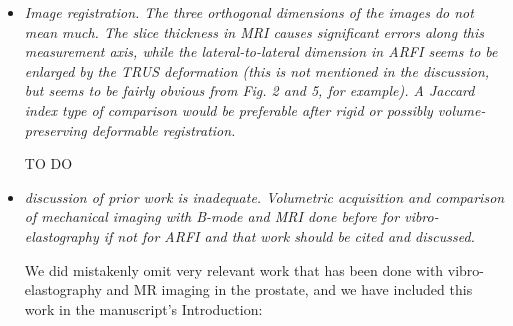 \documentclass[10pt]{article}
\begin{document}
\begin{itemize}
    \item \textit{Image registration. The three orthogonal dimensions of the
            images do not mean much. The slice thickness in MRI causes
            significant errors along this measurement axis, while the
            lateral-to-lateral dimension in ARFI seems to be enlarged by the
            TRUS deformation (this is not mentioned in the discussion, but
            seems to be fairly obvious from Fig. 2 and 5, for example). A
            Jaccard index type of comparison would be preferable after rigid or
            possibly volume-preserving deformable registration.}

    TO DO

    \item \textit{discussion of prior work is inadequate. Volumetric
            acquisition and comparison of mechanical imaging with B-mode and
            MRI done before for vibro-elastography if not for ARFI and that
            work should be cited and discussed.}

    We did mistakenly omit very relevant work that has been done with
    vibro-elastography and MR imaging in the prostate, and we have included
    this work in the manuscript's Introduction:

    \textbf{}

\end{itemize}
\end{document}
